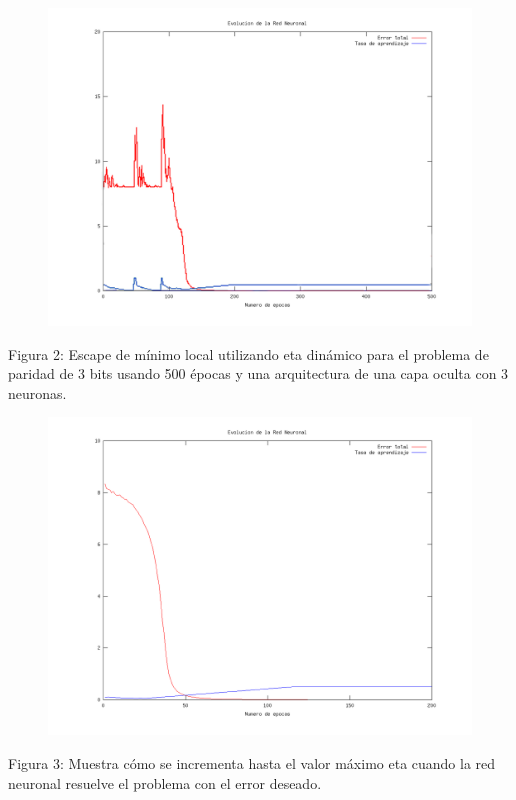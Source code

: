 \documentclass[%
    final,
    reprint,
    notitlepage,
    narroweqnarray,
    inline,
    twoside,
    invited
    ]{ieee}
\begin{document}
\begin{figure}[H]
\begin{center}
\includegraphics[scale=0.30]{./images/escapeminlocal.png}
\label{modelado}
\end{center}
\end{figure}

\begin{center}
\par Figura 2: Escape de mínimo local utilizando eta dinámico para el problema de paridad de 3 bits usando 500 épocas y una arquitectura de una capa oculta con 3 neuronas.
\end{center}

\clearpage

\begin{figure}[H]
\begin{center}
\includegraphics[scale=0.30]{./images/incremento.png}
\label{modelado}
\end{center}
\end{figure}

\begin{center}
\par Figura 3: Muestra cómo se incrementa hasta el valor máximo eta cuando la red neuronal resuelve el problema con el error deseado.
\end{center}




\end{document}

